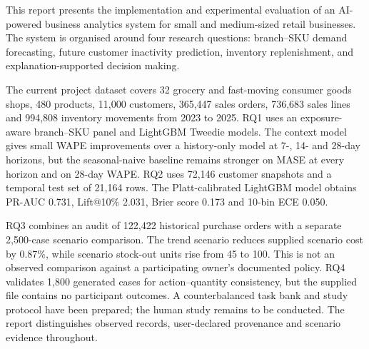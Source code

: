 This report presents the implementation and experimental evaluation of an AI-powered business analytics system for small and medium-sized retail businesses. The system is organised around four research questions: branch--SKU demand forecasting, future customer inactivity prediction, inventory replenishment, and explanation-supported decision making.

The current project dataset covers 32 grocery and fast-moving consumer goods shops, 480 products, 11,000 customers, 365,447 sales orders, 736,683 sales lines and 994,808 inventory movements from 2023 to 2025. RQ1 uses an exposure-aware branch--SKU panel and LightGBM Tweedie models. The context model gives small WAPE improvements over a history-only model at 7-, 14- and 28-day horizons, but the seasonal-naive baseline remains stronger on MASE at every horizon and on 28-day WAPE. RQ2 uses 72,146 customer snapshots and a temporal test set of 21,164 rows. The Platt-calibrated LightGBM model obtains PR-AUC 0.731, Lift@10\% 2.031, Brier score 0.173 and 10-bin ECE 0.050.

RQ3 combines an audit of 122,422 historical purchase orders with a separate 2,500-case scenario comparison. The trend scenario reduces supplied scenario cost by 0.87\%, while scenario stock-out units rise from 45 to 100. This is not an observed comparison against a participating owner's documented policy. RQ4 validates 1,800 generated cases for action--quantity consistency, but the supplied file contains no participant outcomes. A counterbalanced task bank and study protocol have been prepared; the human study remains to be conducted. The report distinguishes observed records, user-declared provenance and scenario evidence throughout.